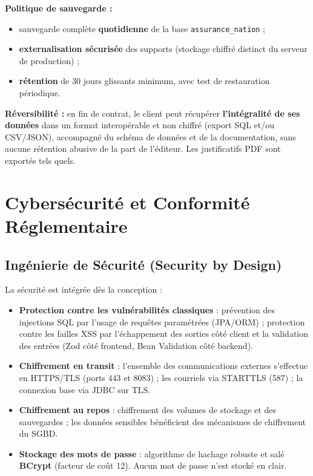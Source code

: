 \documentclass[11pt,a4paper]{article}
\begin{document}
\textbf{Politique de sauvegarde :}
\begin{itemize}[leftmargin=1.4em]
  \item sauvegarde complète \textbf{quotidienne} de la base \texttt{assurance\_nation} ;
  \item \textbf{externalisation sécurisée} des supports (stockage chiffré distinct du
  serveur de production) ;
  \item \textbf{rétention} de 30 jours glissants minimum, avec test de restauration
  périodique.
\end{itemize}

\textbf{Réversibilité :} en fin de contrat, le client peut récupérer
\textbf{l'intégralité de ses données} dans un format interopérable et non chiffré
(export SQL et/ou CSV/JSON), accompagné du schéma de données et de la documentation,
sans aucune rétention abusive de la part de l'éditeur. Les justificatifs PDF sont
exportés tels quels.

\section{Cybersécurité et Conformité Réglementaire}

\subsection{Ingénierie de Sécurité (Security by Design)}
La sécurité est intégrée dès la conception :
\begin{itemize}[leftmargin=1.4em]
  \item \textbf{Protection contre les vulnérabilités classiques} : prévention des
  injections SQL par l'usage de requêtes paramétrées (JPA/ORM) ; protection contre les
  failles XSS par l'échappement des sorties côté client et la validation des entrées
  (Zod côté frontend, Bean Validation côté backend).
  \item \textbf{Chiffrement en transit} : l'ensemble des communications externes
  s'effectue en HTTPS/TLS (ports 443 et 8083) ; les courriels via STARTTLS (587) ; la
  connexion base via JDBC sur TLS.
  \item \textbf{Chiffrement au repos} : chiffrement des volumes de stockage et des
  sauvegardes ; les données sensibles bénéficient des mécanismes de chiffrement du SGBD.
  \item \textbf{Stockage des mots de passe} : algorithme de hachage robuste et salé
  \textbf{BCrypt} (facteur de coût 12). Aucun mot de passe n'est stocké en clair.
\end{itemize}
\end{document}
